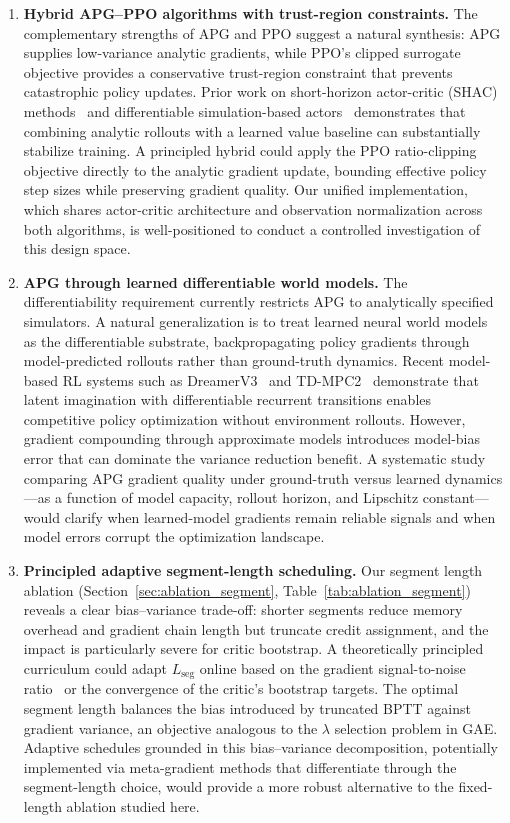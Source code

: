 \documentclass[11pt,a4paper]{article}
\begin{document}
\begin{enumerate}

  \item \textbf{Hybrid APG--PPO algorithms with trust-region constraints.}
  The complementary strengths of APG and PPO suggest a natural synthesis: APG supplies low-variance analytic gradients, while PPO's clipped surrogate objective provides a conservative trust-region constraint that prevents catastrophic policy updates. Prior work on short-horizon actor-critic (SHAC) methods~\cite{guo2023shac} and differentiable simulation-based actors~\cite{xu2022accelerated} demonstrates that combining analytic rollouts with a learned value baseline can substantially stabilize training. A principled hybrid could apply the PPO ratio-clipping objective directly to the analytic gradient update, bounding effective policy step sizes while preserving gradient quality. Our unified implementation, which shares actor-critic architecture and observation normalization across both algorithms, is well-positioned to conduct a controlled investigation of this design space.

  \item \textbf{APG through learned differentiable world models.}
  The differentiability requirement currently restricts APG to analytically specified simulators. A natural generalization is to treat learned neural world models as the differentiable substrate, backpropagating policy gradients through model-predicted rollouts rather than ground-truth dynamics. Recent model-based RL systems such as DreamerV3~\cite{hafner2023dreamerv3} and TD-MPC2~\cite{hansen2024tdmpc2} demonstrate that latent imagination with differentiable recurrent transitions enables competitive policy optimization without environment rollouts. However, gradient compounding through approximate models introduces model-bias error that can dominate the variance reduction benefit. A systematic study comparing APG gradient quality under ground-truth versus learned dynamics---as a function of model capacity, rollout horizon, and Lipschitz constant---would clarify when learned-model gradients remain reliable signals and when model errors corrupt the optimization landscape.

  \item \textbf{Principled adaptive segment-length scheduling.}
  Our segment length ablation (Section~\ref{sec:ablation_segment}, Table~\ref{tab:ablation_segment}) reveals a clear bias--variance trade-off: shorter segments reduce memory overhead and gradient chain length but truncate credit assignment, and the impact is particularly severe for critic bootstrap. A theoretically principled curriculum could adapt $L_{\mathrm{seg}}$ online based on the gradient signal-to-noise ratio~\cite{pascanu2013exploding} or the convergence of the critic's bootstrap targets. The optimal segment length balances the bias introduced by truncated BPTT against gradient variance, an objective analogous to the $\lambda$ selection problem in GAE. Adaptive schedules grounded in this bias--variance decomposition, potentially implemented via meta-gradient methods that differentiate through the segment-length choice, would provide a more robust alternative to the fixed-length ablation studied here.


\end{enumerate}
\end{document}
